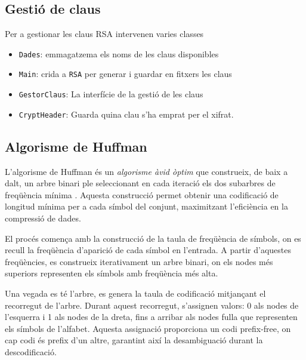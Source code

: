 \documentclass{ieeetj}
\begin{document}
\subsection{Gestió de claus}
Per a gestionar les claus RSA intervenen varies classes
\begin{itemize}
    \item \texttt{Dades}: emmagatzema els noms de les claus disponibles
    \item \texttt{Main}: crida a \texttt{RSA} per generar i guardar en fitxers les claus
    \item \texttt{GestorClaus}: La interfície de la gestió de les claus
    \item \texttt{CryptHeader}: Guarda quina clau s'ha emprat per el xifrat.
\end{itemize}


\subsection{Algorisme de Huffman} 

L’algorisme de Huffman és un \emph{algorisme àvid òptim} que construeix, de baix a dalt, un arbre binari ple seleccionant en cada iteració els dos subarbres de freqüència mínima \cite{huffman1952}. Aquesta construcció permet obtenir una codificació de longitud mínima per a cada símbol del conjunt, maximitzant l'eficiència en la compressió de dades.

El procés comença amb la construcció de la taula de freqüència de símbols, on es recull la freqüència d’aparició de cada símbol en l’entrada. A partir d’aquestes freqüències, es construeix iterativament un arbre binari, on els nodes més superiors representen els símbols amb freqüència més alta. 

Una vegada es té l'arbre, es genera la taula de codificació mitjançant el recorregut de l'arbre. Durant aquest recorregut, s’assignen valors: 0 als nodes de l’esquerra i 1 als nodes de la dreta, fins a arribar als nodes fulla que representen els símbols de l’alfabet. Aquesta assignació proporciona un codi prefix-free, on cap codi és prefix d’un altre, garantint així la desambiguació durant la descodificació.
\end{document}
